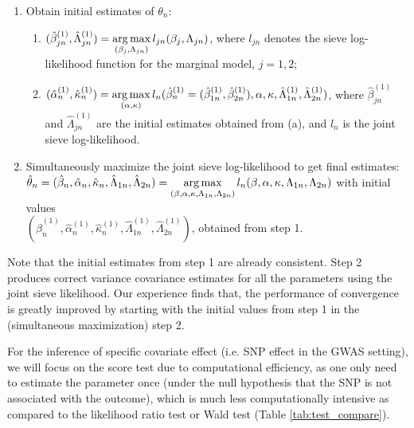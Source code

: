 \begin{enumerate}
\item Obtain initial estimates of $\theta_n$:
\begin{enumerate}
\item $(\hat{\beta}_{jn}^{(1)}, \hat{\Lambda}_{jn}^{(1)}) = \argmaxC\limits_{(\beta_j, \Lambda_{jn})} l_{jn}(\beta_j, \Lambda_{jn})$, where $l_{jn}$ denotes the sieve log-likelihood function for the marginal model, $j=1, 2$;
\vspace{0.1cm}
\item $(\hat{\alpha}_{n}^{(1)},\hat{\kappa}_{n}^{(1)})=\argmaxC\limits_{(\alpha,\kappa)} l_n(\hat{\beta}_{n}^{(1)}=(\hat{\beta}_{1n}^{(1)},\hat{\beta}_{2n}^{(1)}), \alpha, \kappa, \hat{\Lambda}_{1n}^{(1)},\hat{\Lambda}_{2n}^{(1)})$, where $\hat{\beta}_{jn}^{(1)}$ and $\hat{\Lambda}_{jn}^{(1)}$ are the initial estimates obtained from (a), and $l_n$ is the joint sieve log-likelihood.
\end{enumerate}
\vspace{0.2cm}
\item Simultaneously maximize the joint sieve log-likelihood to get final estimates:\\
$\hat{\theta}_n = (\hat{\beta}_n,\hat{\alpha}_n,\hat{\kappa}_n,\hat{\Lambda}_{1n},\hat{\Lambda}_{2n})=\argmaxC\limits_{(\beta,\alpha,\kappa,\Lambda_{1n},\Lambda_{2n})} l_n(\beta,\alpha,\kappa,\Lambda_{1n},\Lambda_{2n})$ with initial values \\ $(\hat{\beta}_{n}^{(1)},\hat{\alpha}_{n}^{(1)},\hat{\kappa}_{n}^{(1)},\hat{\Lambda}_{1n}^{(1)},\hat{\Lambda}_{2n}^{(1)})$, obtained from step 1.
\end{enumerate}

Note that the initial estimates from step 1 are already consistent. Step 2 produces correct variance covariance estimates for all the parameters using the joint sieve likelihood. Our experience finds that, the performance of convergence is greatly improved by starting with the initial values from step 1 in the (simultaneous maximization) step 2. 

For the inference of specific covariate effect (i.e. SNP effect in the GWAS setting), we will focus on the score test due to computational efficiency, as one only need to estimate the parameter once (under the null hypothesis that the SNP is not associated with the outcome), which is much less computationally intensive as compared to the likelihood ratio test or Wald test (Table \ref{tab:test_compare}).


